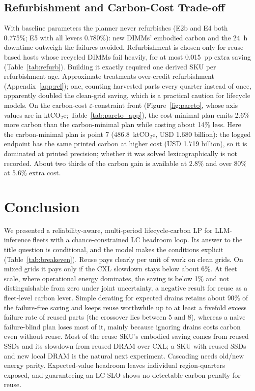 \documentclass{article} %
\begin{document}
\subsection{Refurbishment and Carbon-Cost Trade-off}
\label{sec:refurb}
\label{sec:robustness}
With baseline parameters the planner never refurbishes (E2b and E4 both 0.775\%; E5 with all levers 0.780\%): new DIMMs' embodied carbon and the 24~h downtime outweigh the failures avoided. Refurbishment is chosen only for reuse-based hosts whose recycled DIMMs fail heavily, for at most 0.015~pp extra saving (Table~\ref{tab:refurb}). Building it exactly required one derived SKU per refurbishment age. Approximate treatments over-credit refurbishment (Appendix~\ref{app:rel}); one, counting harvested parts every quarter instead of once, apparently doubled the clean-grid saving, which is a practical caution for lifecycle models. On the carbon-cost $\varepsilon$-constraint front (Figure~\ref{fig:pareto}, whose axis values are in ktCO$_2$e; Table~\ref{tab:pareto_app}), the cost-minimal plan emits 2.6\% more carbon than the carbon-minimal plan while costing about 14\% less. Here the carbon-minimal plan is point 7 (486.8~ktCO$_2$e, USD 1.680 billion): the logged endpoint has the same printed carbon at higher cost (USD 1.719 billion), so it is dominated at printed precision; whether it was solved lexicographically is not recorded. About two thirds of the carbon gain is available at 2.8\% and over 80\% at 5.6\% extra cost.

\section{Conclusion}
\label{sec:conclusion}
We presented a reliability-aware, multi-period lifecycle-carbon LP for LLM-inference fleets with a chance-constrained LC headroom loop. Its answer to the title question is conditional, and the model makes the conditions explicit (Table~\ref{tab:breakeven}). Reuse pays clearly per unit of work on clean grids. On mixed grids it pays only if the CXL slowdown stays below about 6\%. At fleet scale, where operational energy dominates, the saving is below 1\% and not distinguishable from zero under joint uncertainty, a negative result for reuse as a fleet-level carbon lever. Simple derating for expected drains retains about 90\% of the failure-free saving and keeps reuse worthwhile up to at least a fivefold excess failure rate of reused parts (the crossover lies between 5 and 8), whereas a naive failure-blind plan loses most of it, mainly because ignoring drains costs carbon even without reuse. Most of the reuse SKU's embodied saving comes from reused SSDs and its slowdown from reused DRAM over CXL; a SKU with reused SSDs and new local DRAM is the natural next experiment. Cascading needs old/new energy parity. Expected-value headroom leaves individual region-quarters exposed, and guaranteeing an LC SLO shows no detectable carbon penalty for reuse.
\end{document}
